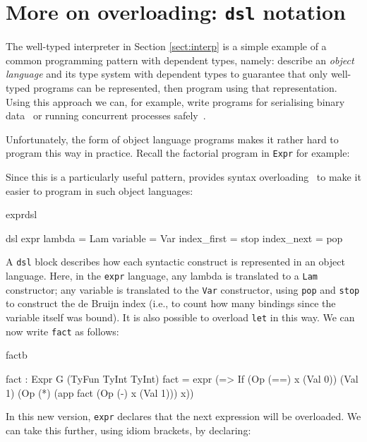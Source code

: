 \section{More on overloading: \texttt{dsl} notation}

The well-typed interpreter in Section \ref{sect:interp} is a simple example of
a common programming pattern with dependent types, namely: describe an
\emph{object language}
and its type system with dependent types to guarantee that only well-typed programs
can be represented, then program using that representation. Using this approach
we can, for example, write programs for serialising binary data~\cite{plpv11} or
running concurrent processes safely~\cite{cbconc-fi}.

Unfortunately, the form of object language programs makes it rather hard to program
this way in practice. Recall the factorial program in \texttt{Expr} for example:


\noindent
Since this is a particularly useful pattern, \Idris{} provides syntax
overloading~\cite{res-dsl-padl12} to make it easier to program in such
object languages:

\begin{SaveVerbatim}{exprdsl}

dsl expr
    lambda      = Lam
    variable    = Var
    index_first = stop
    index_next  = pop

\end{SaveVerbatim}

\noindent
A \texttt{dsl} block describes how each syntactic construct is represented in an
object language. Here, in the \texttt{expr} language, any \Idris{} lambda is
translated to a \texttt{Lam} constructor; any variable is translated to the
\texttt{Var} constructor, using \texttt{pop} and \texttt{stop} to construct the
de Bruijn index (i.e., to count how many bindings since the variable itself was bound).
It is also possible to overload \texttt{let} in this way. We can now write \texttt{fact}
as follows:

\begin{SaveVerbatim}{factb}

fact : Expr G (TyFun TyInt TyInt)
fact = expr (\x => If (Op (==) x (Val 0))
                      (Val 1) (Op (*) (app fact (Op (-) x (Val 1))) x))

\end{SaveVerbatim}

\noindent
In this new version, \texttt{expr} declares that the next expression will be overloaded.
We can take this further, using idiom brackets, by declaring:

